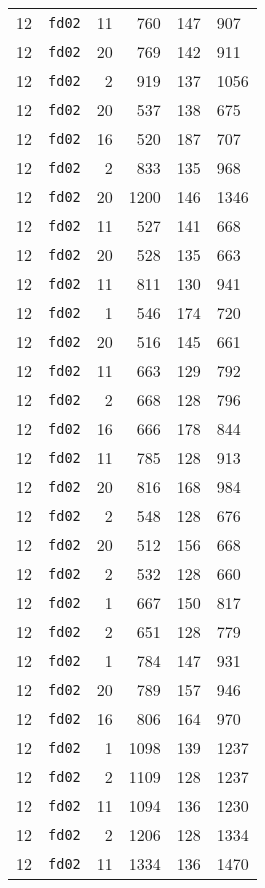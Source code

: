 \documentclass{article}
\begin{document}
\begin{table}[h!]
\begin{tabular}{llrrrl}
    12 & \texttt{fd02} & 11 & 760 & 147 & 907 \\
    12 & \texttt{fd02} & 20 & 769 & 142 & 911 \\
    12 & \texttt{fd02} & 2 & 919 & 137 & 1056 \\
    12 & \texttt{fd02} & 20 & 537 & 138 & 675 \\
    12 & \texttt{fd02} & 16 & 520 & 187 & 707 \\
    12 & \texttt{fd02} & 2 & 833 & 135 & 968 \\
    12 & \texttt{fd02} & 20 & 1200 & 146 & 1346 \\
    12 & \texttt{fd02} & 11 & 527 & 141 & 668 \\
    12 & \texttt{fd02} & 20 & 528 & 135 & 663 \\
    12 & \texttt{fd02} & 11 & 811 & 130 & 941 \\
    12 & \texttt{fd02} & 1 & 546 & 174 & 720 \\
    12 & \texttt{fd02} & 20 & 516 & 145 & 661 \\
    12 & \texttt{fd02} & 11 & 663 & 129 & 792 \\
    12 & \texttt{fd02} & 2 & 668 & 128 & 796 \\
    12 & \texttt{fd02} & 16 & 666 & 178 & 844 \\
    12 & \texttt{fd02} & 11 & 785 & 128 & 913 \\
    12 & \texttt{fd02} & 20 & 816 & 168 & 984 \\
    12 & \texttt{fd02} & 2 & 548 & 128 & 676 \\
    12 & \texttt{fd02} & 20 & 512 & 156 & 668 \\
    12 & \texttt{fd02} & 2 & 532 & 128 & 660 \\
    12 & \texttt{fd02} & 1 & 667 & 150 & 817 \\
    12 & \texttt{fd02} & 2 & 651 & 128 & 779 \\
    12 & \texttt{fd02} & 1 & 784 & 147 & 931 \\
    12 & \texttt{fd02} & 20 & 789 & 157 & 946 \\
    12 & \texttt{fd02} & 16 & 806 & 164 & 970 \\
    12 & \texttt{fd02} & 1 & 1098 & 139 & 1237 \\
    12 & \texttt{fd02} & 2 & 1109 & 128 & 1237 \\
    12 & \texttt{fd02} & 11 & 1094 & 136 & 1230 \\
    12 & \texttt{fd02} & 2 & 1206 & 128 & 1334 \\
    12 & \texttt{fd02} & 11 & 1334 & 136 & 1470 \\

\end{tabular}
\end{table}
\end{document}
